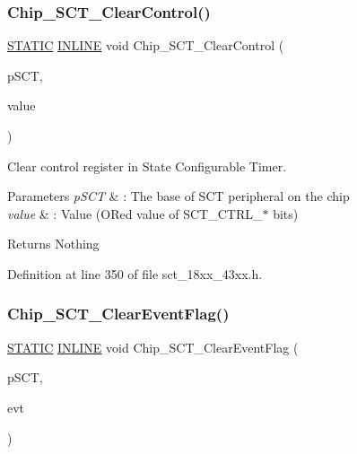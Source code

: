 \subsubsection{\texorpdfstring{Chip\+\_\+\+S\+C\+T\+\_\+\+Clear\+Control()}{Chip\_SCT\_ClearControl()}}
{\footnotesize\ttfamily \hyperlink{group___l_p_c___types___public___macros_ga10b2d890d871e1489bb02b7e70d9bdfb}{S\+T\+A\+T\+IC} \hyperlink{spifi__18xx__43xx_8h_a2eb6f9e0395b47b8d5e3eeae4fe0c116}{I\+N\+L\+I\+NE} void Chip\+\_\+\+S\+C\+T\+\_\+\+Clear\+Control (\begin{DoxyParamCaption}\item[{\hyperlink{struct_l_p_c___s_c_t___t}{L\+P\+C\+\_\+\+S\+C\+T\+\_\+T} $\ast$}]{p\+S\+CT,  }\item[{uint32\+\_\+t}]{value }\end{DoxyParamCaption})}



Clear control register in State Configurable Timer. 


\begin{DoxyParams}{Parameters}
{\em p\+S\+CT} & \+: The base of S\+CT peripheral on the chip \\
\hline
{\em value} & \+: Value (O\+Red value of S\+C\+T\+\_\+\+C\+T\+R\+L\+\_\+$\ast$ bits) \\
\hline
\end{DoxyParams}
\begin{DoxyReturn}{Returns}
Nothing 
\end{DoxyReturn}


Definition at line 350 of file sct\+\_\+18xx\+\_\+43xx.\+h.

\mbox{\label{group___s_c_t__18_x_x__43_x_x_gaf0b410c164469e503d4f590aae33b916}} 
\subsubsection{\texorpdfstring{Chip\+\_\+\+S\+C\+T\+\_\+\+Clear\+Event\+Flag()}{Chip\_SCT\_ClearEventFlag()}}
{\footnotesize\ttfamily \hyperlink{group___l_p_c___types___public___macros_ga10b2d890d871e1489bb02b7e70d9bdfb}{S\+T\+A\+T\+IC} \hyperlink{spifi__18xx__43xx_8h_a2eb6f9e0395b47b8d5e3eeae4fe0c116}{I\+N\+L\+I\+NE} void Chip\+\_\+\+S\+C\+T\+\_\+\+Clear\+Event\+Flag (\begin{DoxyParamCaption}\item[{\hyperlink{struct_l_p_c___s_c_t___t}{L\+P\+C\+\_\+\+S\+C\+T\+\_\+T} $\ast$}]{p\+S\+CT,  }\item[{\hyperlink{group___s_c_t__18_x_x__43_x_x_ga9c76365e19f53e676f05cb7ccec143f7}{C\+H\+I\+P\+\_\+\+S\+C\+T\+\_\+\+E\+V\+E\+N\+T\+\_\+T}}]{evt }\end{DoxyParamCaption})}



